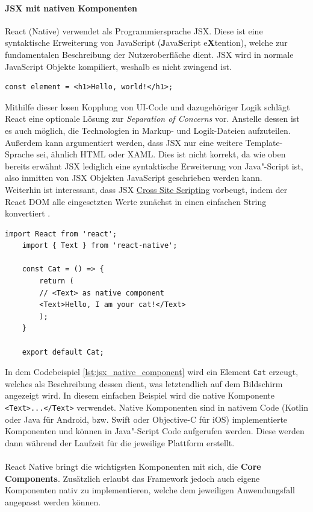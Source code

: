 \paragraph{JSX mit nativen Komponenten}
React (Native) verwendet als Programmiersprache JSX. Diese ist eine syntaktische Erweiterung von JavaScript (\textbf{J}ava\textbf{S}cript e\textbf{X}tention), welche zur fundamentalen Beschreibung der Nutzeroberfläche dient. JSX wird in normale JavaScript Objekte kompiliert, weshalb es nicht zwingend ist. \\
\begin{lstlisting}[caption=JSX Hello World Element]
	const element = <h1>Hello, world!</h1>;
\end{lstlisting}
Mithilfe dieser losen Kopplung von UI-Code und dazugehöriger Logik schlägt React eine optionale Lösung zur \textit{Separation of Concerns} vor. Anstelle dessen ist es auch möglich, die Technologien in Markup- und Logik-Dateien aufzuteilen. \\
Außerdem kann argumentiert werden, dass JSX nur eine weitere Template-Sprache sei, ähnlich HTML oder XAML. Dies ist nicht korrekt, da wie oben bereits erwähnt JSX lediglich eine syntaktische Erweiterung von Java"-Script ist, also inmitten von JSX Objekten JavaScript geschrieben werden kann.\\
Weiterhin ist interessant, dass JSX \href{https://owasp.org/www-community/attacks/xss/}{Cross Site Scripting} vorbeugt, indem der React DOM alle eingesetzten Werte zunächst in einen einfachen String konvertiert \cite{react2021}.
\begin{lstlisting}[caption=Native Komponenten, label=lst:jsx_native_component]
	import React from 'react';
	import { Text } from 'react-native';
	
	const Cat = () => {
		return (
		// <Text> as native component
		<Text>Hello, I am your cat!</Text>
		);
	}
	
	export default Cat;
\end{lstlisting}
In dem Codebeispiel \ref{lst:jsx_native_component} wird ein Element \texttt{Cat} erzeugt, welches als Beschreibung dessen dient, was letztendlich auf dem Bildschirm angezeigt wird. 
In diesem einfachen Beispiel wird die native Komponente \texttt{<Text>...</Text>} verwendet. 
Native Komponenten sind in nativem Code (Kotlin oder Java für Android, bzw. Swift oder Objective-C für iOS) implementierte Komponenten und können in Java"-Script Code aufgerufen werden.
Diese werden dann während der Laufzeit für die jeweilige Plattform erstellt.\\
\\
React Native bringt die wichtigsten Komponenten mit sich, die \textbf{Core Components}. Zusätzlich erlaubt das Framework jedoch auch eigene Komponenten nativ zu implementieren, welche dem jeweiligen Anwendungsfall angepasst werden können.\\

